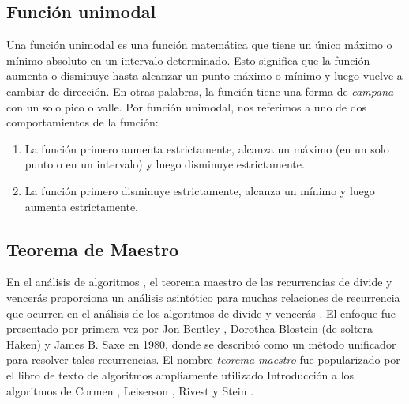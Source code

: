 \subsection{Función unimodal}
Una función unimodal es una función matemática que tiene un único máximo o mínimo absoluto en un intervalo determinado. Esto significa que la función aumenta o disminuye hasta alcanzar un punto máximo o mínimo y luego vuelve a cambiar de dirección. En otras palabras, la función tiene una forma de \emph{campana} con un solo pico o valle. Por función unimodal, nos referimos a uno de dos comportamientos de la función:

\begin{enumerate}
	\item La función primero aumenta estrictamente, alcanza un máximo (en un solo punto o en un intervalo) y luego disminuye estrictamente.
	\item La función primero disminuye estrictamente, alcanza un mínimo y luego aumenta estrictamente.
\end{enumerate}

\subsection{Teorema de Maestro}
En el análisis de algoritmos , el teorema maestro de las recurrencias de divide y vencerás proporciona un análisis asintótico para muchas relaciones de recurrencia que ocurren en el análisis de los algoritmos de divide y vencerás . El enfoque fue presentado por primera vez por Jon Bentley , Dorothea Blostein (de soltera Haken) y James B. Saxe en 1980, donde se describió como un método unificador para resolver tales recurrencias. El nombre \emph{teorema maestro} fue popularizado por el libro de texto de algoritmos ampliamente utilizado Introducción a los algoritmos de Cormen , Leiserson , Rivest y Stein .